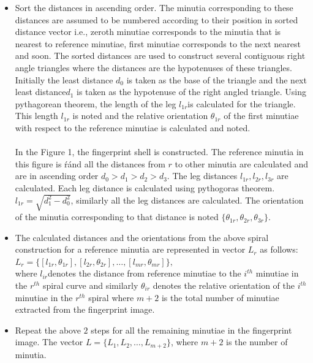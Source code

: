\documentclass[14pt, oneside]{article}   	%
\begin{document}
\begin{itemize}
\item Sort the distances in ascending order. The minutia corresponding to these distances are assumed to be numbered according to their position in sorted distance vector i.e., zeroth minutiae corresponds to the minutia that is nearest to reference minutiae, first minutiae corresponds to the next nearest and soon. The sorted distances are used to construct several contiguous right angle triangles where the distances are the hypotenuses of these triangles. Initially the least distance $d_0$ is taken as the base of the triangle and the next least distance$d_1$ is taken as the hypotenuse of the right angled triangle. Using pythagorean theorem, the length of the leg $l_{1r}$is calculated for the triangle. This length $l_{1r}$ is noted and the relative orientation $\theta_{1r}$ of the first minutiae with respect to the reference minutiae is calculated and noted.
\paragraph{}
In the Figure 1, the fingerprint shell is constructed. The reference minutia in this figure is \'r\' and all the distances from $r$ to other minutia are calculated and are in ascending order $ d_0 > d_1> d_2 >d_3 $. The leg distances $l_{1r},l_{2r},l_{3r}$ are calculated. Each leg distance is calculated using pythogoras theorem. $l_{1r}=\sqrt{d_1^2 - d_0^2}$, similarly all the leg distances are calculated. The orientation of the minutia corresponding to that distance is noted $\{\theta_{1r},\theta_{2r},\theta_{3r}\}$.

\item The calculated distances and the orientations from the above spiral construction for a reference minutia are represented in vector $L_r$ as follows:\\
$L_r= \{ [l_{1r},\theta_{1r}],[l_{2r},\theta_{2r}],\dots,[l_{mr},\theta_{mr}]\},$
\\ where $l_{ir} $denotes the distance from reference minutiae to the $i^{th}$ minutiae in the $r^{th}$ spiral curve and similarly $\theta_{ir}$ denotes the relative orientation of the $i^{th}$ minutiae in the $r^{th}$ spiral where $m+2$ is the total number of  minutiae extracted from the fingerprint image.

\item Repeat the above $2$ steps for all the remaining minutiae in the fingerprint image. The vector $L=\{ L_1,L_2,\dots,L_{m+2} \}$, where $m+2$ is the number of minutia.

\end{itemize}
\end{document}
